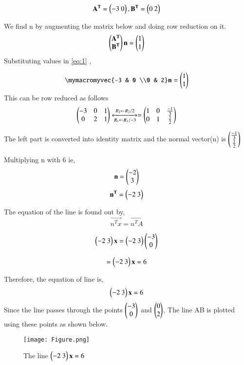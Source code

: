 \documentclass[journal,12pt,twocolumn]{IEEEtran}
\begin{document}
\begin{equation}
 \mathbf{A^T}=\begin{pmatrix}-3 \ 0\end{pmatrix} ,  \mathbf{B^T}=\begin{pmatrix}0 \ 2\end{pmatrix}
\end{equation}

We find n by augmenting the matrix below and doing row reduction on it.
\begin{align}
\begin{pmatrix}\mathbf{A^T} \\ \mathbf{B^T}\end{pmatrix}\mathbf{n} = \begin{pmatrix}1\\1\end{pmatrix}\label{eq:1}
\end{align}
Substituting values in \ref{eq:1} ,

 \begin{equation}
\mymacromyvec{-3 & 0 \\0 & 2}\vec{n}
=
\myvec{1\\1}
\end{equation}
This can be row reduced as follows
\begin{equation}
\begin{pmatrix}-3 & 0 & 1\\0 & 2 & 1\end{pmatrix} 
\xleftrightarrow [R_1\leftarrow R_1/-3]{R_2\leftarrow R_2/2}
=
\begin{pmatrix}1 & 0 & \frac{-1}{3}\\0 & 1 & \frac{1}{2}\end{pmatrix}
\end{equation}

The left part is converted into identity matrix and the normal vector(n) is $\begin{pmatrix}\frac{-1}{3}\\\frac{1}{2}\end{pmatrix}$

Multiplying n with 6 
ie,\\
\begin{equation}
    \mathbf{n} = \begin{pmatrix}{-2}\\ {3}\end{pmatrix}
\end{equation}
\begin{equation}
\mathbf{n^T}  = \begin{pmatrix}{-2}\ {3}\end{pmatrix}
      \end{equation} 


The equation of the line is found out by,
\begin{equation}
\vec{n^Tx} = \vec{n^TA}
\end{equation}

\begin{equation}
\myvec{{-2}\ {3}}\vec{x} =  \myvec{{-2}\ {3}}\myvec{-3 \\ 0}
\end{equation}

\begin{equation}
= \begin{pmatrix}{-2}\ {3}\end{pmatrix}\mathbf{x} = 6
\end{equation}

 Therefore, the equation of line is,
\begin{equation}
   \begin{pmatrix}{-2}\ {3}\end{pmatrix}\mathbf{x} = 6
\end{equation}
\cleardoublepage
Since the line passes through the points $\begin{pmatrix}-3\\0\end{pmatrix}$ and $\begin{pmatrix}0\\2\end{pmatrix}$, The line AB is plotted using these points as shown below.


\begin{figure}[!h]
         \centering
         \texttt{[image: Figure.png]}
         \caption{The line $\begin{pmatrix}{-2}\ {3}\end{pmatrix}\mathbf{x} = 6$ }
         \label{Figure}
\end{figure}
\end{document}

